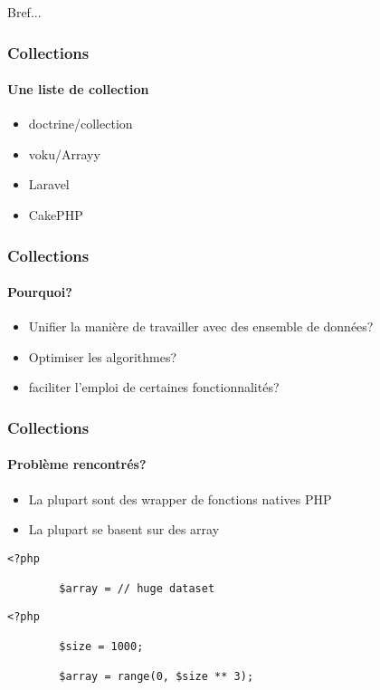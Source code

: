 \begin{frameC}{Bref...}

\end{frameC}

\begin{frame}
	\frametitle{Collections}
    \framesubtitle{Une liste de collection}

    \begin{itemize}[<+->]
        \item doctrine/collection
        \item voku/Arrayy
        \item Laravel
        \item CakePHP
    \end{itemize}
\end{frame}

\begin{frame}
	\frametitle{Collections}
    \framesubtitle{Pourquoi?}

    \begin{itemize}[<+->]
        \item Unifier la manière de travailler avec des ensemble de données?
        \item Optimiser les algorithmes?
        \item faciliter l'emploi de certaines fonctionnalités?
    \end{itemize}
\end{frame}

\begin{frame}
	\frametitle{Collections}
    \framesubtitle{Problème rencontrés?}

    \begin{itemize}[<+->]
        \item La plupart sont des wrapper de fonctions natives PHP
        \item La plupart se basent sur des array
    \end{itemize}
\end{frame}

\begin{frame}[fragile]
    \begin{lstlisting}[firstnumber=1]
        <?php

        $array = // huge dataset
    \end{lstlisting}
\end{frame}

\begin{frame}[fragile]
    \begin{lstlisting}[firstnumber=1]
        <?php

        $size = 1000;

        $array = range(0, $size ** 3);
    \end{lstlisting}
\end{frame}

